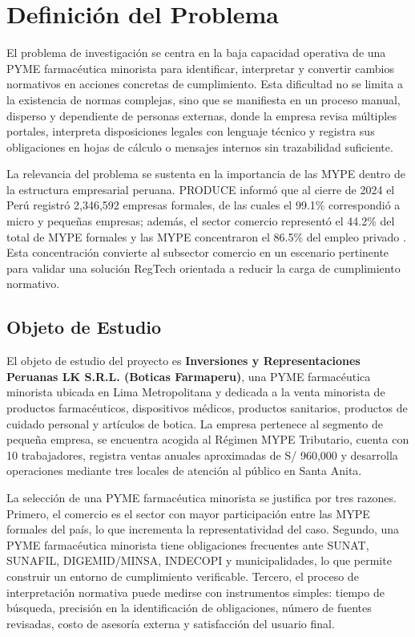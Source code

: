 \documentclass[12pt,a4paper,oneside]{report}
\begin{document}
\section{Definición del Problema}\label{sec:definicion-del-problema}

El problema de investigación se centra en la baja capacidad operativa de una PYME farmacéutica minorista para identificar, interpretar y convertir cambios normativos en acciones concretas de cumplimiento. Esta dificultad no se limita a la existencia de normas complejas, sino que se manifiesta en un proceso manual, disperso y dependiente de personas externas, donde la empresa revisa múltiples portales, interpreta disposiciones legales con lenguaje técnico y registra sus obligaciones en hojas de cálculo o mensajes internos sin trazabilidad suficiente.

La relevancia del problema se sustenta en la importancia de las MYPE dentro de la estructura empresarial peruana. PRODUCE informó que al cierre de 2024 el Perú registró 2,346,592 empresas formales, de las cuales el 99.1\% correspondió a micro y pequeñas empresas; además, el sector comercio representó el 44.2\% del total de MYPE formales y las MYPE concentraron el 86.5\% del empleo privado \parencite{produce2025empresasformales}. Esta concentración convierte al subsector comercio en un escenario pertinente para validar una solución RegTech orientada a reducir la carga de cumplimiento normativo.

\subsection{Objeto de Estudio}\label{subsec:objeto-de-estudio}

El objeto de estudio del proyecto es \textbf{Inversiones y Representaciones Peruanas LK S.R.L. (Boticas Farmaperu)}, una PYME farmacéutica minorista ubicada en Lima Metropolitana y dedicada a la venta minorista de productos farmacéuticos, dispositivos médicos, productos sanitarios, productos de cuidado personal y artículos de botica. La empresa pertenece al segmento de pequeña empresa, se encuentra acogida al Régimen MYPE Tributario, cuenta con 10 trabajadores, registra ventas anuales aproximadas de S/ 960,000 y desarrolla operaciones mediante tres locales de atención al público en Santa Anita.

La selección de una PYME farmacéutica minorista se justifica por tres razones. Primero, el comercio es el sector con mayor participación entre las MYPE formales del país, lo que incrementa la representatividad del caso. Segundo, una PYME farmacéutica minorista tiene obligaciones frecuentes ante SUNAT, SUNAFIL, DIGEMID/MINSA, INDECOPI y municipalidades, lo que permite construir un entorno de cumplimiento verificable. Tercero, el proceso de interpretación normativa puede medirse con instrumentos simples: tiempo de búsqueda, precisión en la identificación de obligaciones, número de fuentes revisadas, costo de asesoría externa y satisfacción del usuario final.
\end{document}
